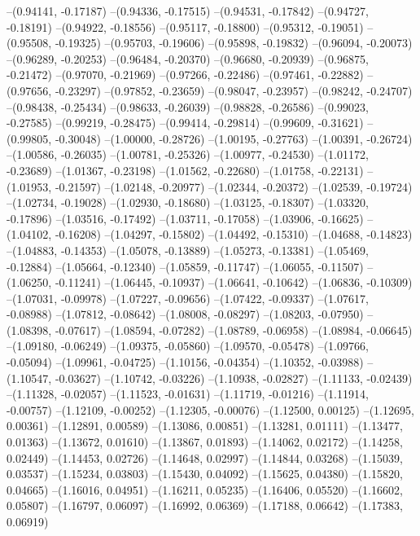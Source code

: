 --(0.94141, -0.17187)
--(0.94336, -0.17515)
--(0.94531, -0.17842)
--(0.94727, -0.18191)
--(0.94922, -0.18556)
--(0.95117, -0.18800)
--(0.95312, -0.19051)
--(0.95508, -0.19325)
--(0.95703, -0.19606)
--(0.95898, -0.19832)
--(0.96094, -0.20073)
--(0.96289, -0.20253)
--(0.96484, -0.20370)
--(0.96680, -0.20939)
--(0.96875, -0.21472)
--(0.97070, -0.21969)
--(0.97266, -0.22486)
--(0.97461, -0.22882)
--(0.97656, -0.23297)
--(0.97852, -0.23659)
--(0.98047, -0.23957)
--(0.98242, -0.24707)
--(0.98438, -0.25434)
--(0.98633, -0.26039)
--(0.98828, -0.26586)
--(0.99023, -0.27585)
--(0.99219, -0.28475)
--(0.99414, -0.29814)
--(0.99609, -0.31621)
--(0.99805, -0.30048)
--(1.00000, -0.28726)
--(1.00195, -0.27763)
--(1.00391, -0.26724)
--(1.00586, -0.26035)
--(1.00781, -0.25326)
--(1.00977, -0.24530)
--(1.01172, -0.23689)
--(1.01367, -0.23198)
--(1.01562, -0.22680)
--(1.01758, -0.22131)
--(1.01953, -0.21597)
--(1.02148, -0.20977)
--(1.02344, -0.20372)
--(1.02539, -0.19724)
--(1.02734, -0.19028)
--(1.02930, -0.18680)
--(1.03125, -0.18307)
--(1.03320, -0.17896)
--(1.03516, -0.17492)
--(1.03711, -0.17058)
--(1.03906, -0.16625)
--(1.04102, -0.16208)
--(1.04297, -0.15802)
--(1.04492, -0.15310)
--(1.04688, -0.14823)
--(1.04883, -0.14353)
--(1.05078, -0.13889)
--(1.05273, -0.13381)
--(1.05469, -0.12884)
--(1.05664, -0.12340)
--(1.05859, -0.11747)
--(1.06055, -0.11507)
--(1.06250, -0.11241)
--(1.06445, -0.10937)
--(1.06641, -0.10642)
--(1.06836, -0.10309)
--(1.07031, -0.09978)
--(1.07227, -0.09656)
--(1.07422, -0.09337)
--(1.07617, -0.08988)
--(1.07812, -0.08642)
--(1.08008, -0.08297)
--(1.08203, -0.07950)
--(1.08398, -0.07617)
--(1.08594, -0.07282)
--(1.08789, -0.06958)
--(1.08984, -0.06645)
--(1.09180, -0.06249)
--(1.09375, -0.05860)
--(1.09570, -0.05478)
--(1.09766, -0.05094)
--(1.09961, -0.04725)
--(1.10156, -0.04354)
--(1.10352, -0.03988)
--(1.10547, -0.03627)
--(1.10742, -0.03226)
--(1.10938, -0.02827)
--(1.11133, -0.02439)
--(1.11328, -0.02057)
--(1.11523, -0.01631)
--(1.11719, -0.01216)
--(1.11914, -0.00757)
--(1.12109, -0.00252)
--(1.12305, -0.00076)
--(1.12500, 0.00125)
--(1.12695, 0.00361)
--(1.12891, 0.00589)
--(1.13086, 0.00851)
--(1.13281, 0.01111)
--(1.13477, 0.01363)
--(1.13672, 0.01610)
--(1.13867, 0.01893)
--(1.14062, 0.02172)
--(1.14258, 0.02449)
--(1.14453, 0.02726)
--(1.14648, 0.02997)
--(1.14844, 0.03268)
--(1.15039, 0.03537)
--(1.15234, 0.03803)
--(1.15430, 0.04092)
--(1.15625, 0.04380)
--(1.15820, 0.04665)
--(1.16016, 0.04951)
--(1.16211, 0.05235)
--(1.16406, 0.05520)
--(1.16602, 0.05807)
--(1.16797, 0.06097)
--(1.16992, 0.06369)
--(1.17188, 0.06642)
--(1.17383, 0.06919)

